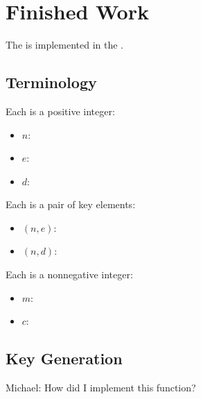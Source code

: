 \section{Finished Work}

The \cs{} \rsa{} is implemented in the \cf{} \cry.

\cite{RSA}


\subsection{Terminology}

Each  is a positive integer:
\begin{itemize}
\item $n$: 
\item $e$: 
\item $d$: 
\end{itemize}

Each  is a pair of key elements:
\begin{itemize}
\item $(n, e)$: 
\item $(n, d)$: 
\end{itemize}

Each  is a nonnegative integer:
\begin{itemize}
\item $m$: 
\item $c$: 
\end{itemize}


\subsection{Key Generation}

Michael:
How did I implement this function?

